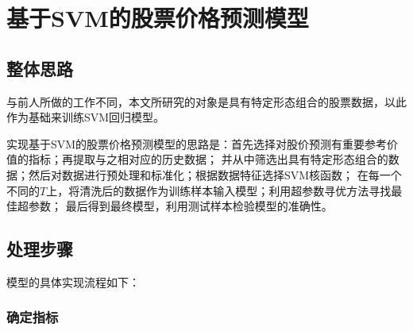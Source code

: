 \chapter{基于SVM的股票价格预测模型}

\section{整体思路}

与前人所做的工作不同，本文所研究的对象是具有特定形态组合的股票数据，以此作为基础来训练SVM回归模型。

实现基于SVM的股票价格预测模型的思路是：首先选择对股价预测有重要参考价值的指标；再提取与之相对应的历史数据；
并从中筛选出具有特定形态组合的数据；然后对数据进行预处理和标准化；根据数据特征选择SVM核函数；
在每一个不同的$T$上，将清洗后的数据作为训练样本输入模型；利用超参数寻优方法寻找最佳超参数；
最后得到最终模型，利用测试样本检验模型的准确性。

\section{处理步骤}

模型的具体实现流程如下：

\subsection{确定指标}

